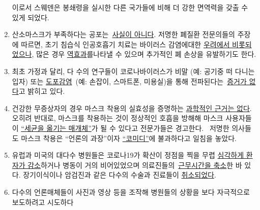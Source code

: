 \begin{enumerate}
  이로서 스웨덴은 봉쇄령을 실시한 다른 국가들에 비해 더 강한 면역력을
  갖출 수 있게 되었다.
\item
  산소마스크가 부족하다는
  공포는~\href{https://apnews.com/8ccd325c2be9bf454c2128dcb7bd616d}{사실이
  아니다}. 저명한 폐질환 전문의들의 주장에 따르면, 초기 침습식
  인공호흡기 치료는 바이러스 감염에대한
  \href{https://www.dailymail.co.uk/news/article-8262351/Nurse-New-York-claims-city-killing-COVID-19-patients-putting-ventilators.html}{우려에서
  비롯되었으나}, 많은 경우
  \href{https://www.medscape.com/viewarticle/928156}{역효과}를나타낼 수
  있으며 추가적인 폐 손상을 유발하기도 한다. 
\item
  최초 가정과 달리, 다 수의 연구들이 코로나바이러스가 비말 (예: 공기중
  떠 다니는 입자) 또는
  \href{https://www.telegraph.co.uk/news/2020/04/02/no-proof-coronavirus-can-spread-shopping-says-leading-german/}{도포감염}~(예:
  손잡이, 스마트폰, 미용실)을 통해
  전파된다는~\href{https://www.who.int/news-room/commentaries/detail/modes-of-transmission-of-virus-causing-covid-19-implications-for-ipc-precaution-recommendations}{증거가
  없다}고 밝히고 있다.~
\item
  건강한 무증상자의 경우 마스크 착용의 실효성을 증명하는
  \href{https://www.researchgate.net/publication/340570735_Masks_Don't_Work_A_review_of_science_relevant_to_COVID-19_social_policy}{과학적인
  근거는 없다}. 오히려 반대로, 마스크를 착용하는 것이 정상적인 호흡을
  방해해 마스크 사용자들이
  \href{https://de.sputniknews.com/interviews/20200425326953541-corona-gefahr-virologe/}{``세균을
  옮기는 매개체''}가 될 수 있다고 전문가들은 경고한다. ~저명한 의사들도
  마스크 착용은 ``언론의 과장''이자
  \href{https://www.aerztezeitung.de/Politik/Montgomery-haelt-Maskenpflicht-fuer-falsch-408844.html}{``코미디''}에
  불과하다고 일침을 놓았다.
\item
  유럽과 미국의 대다수 병원들은 코로나19가 확산이 정점을 찍을 무렵
  \href{https://www.hsj.co.uk/acute-care/nhs-hospitals-have-four-times-more-empty-beds-than-normal/7027392.article}{심각하게
  환자가 감소}하거나 병동이 거의 비어있었으며
  의료진들의~\href{https://www.usatoday.com/story/news/health/2020/04/02/coronavirus-pandemic-jobs-us-health-care-workers-furloughed-laid-off/5102320002/}{근무시간을
  축소}한 바 있다. 장기이식이나 암검진과 같은 다수의 수술과 진료들이
  \href{https://www.sfchronicle.com/bayarea/article/Stanford-hospital-system-to-cut-pay-20-furlough-15227591.php}{취소되었다}.
\item
  다수의 언론매체들이 사진과 영상 등을 조작해 병원들의 상황을 보다
  자극적으로 보도하려고 시도하다

\end{enumerate}
